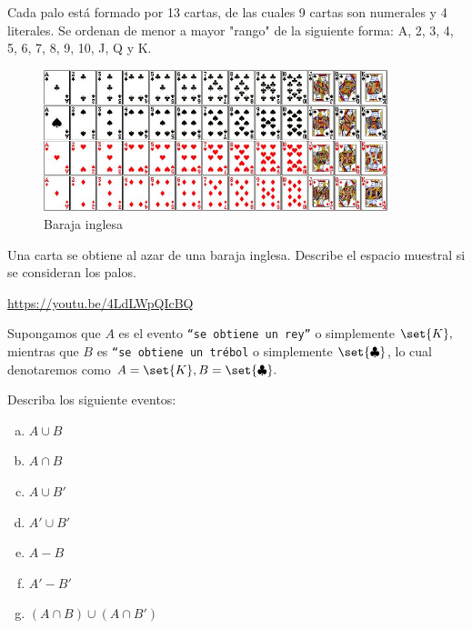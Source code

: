  Cada palo está formado por 13 cartas, de las cuales 9 cartas son numerales y 4 literales. Se ordenan de menor a mayor "rango" de la siguiente forma: A, 2, 3, 4, 5, 6, 7, 8, 9, 10, J, Q y K.
 
 \begin{figure}
  \centering
  \includegraphics[width=10cm]{./pe/deck.jpg}
  \caption{Baraja inglesa}
  \label{fig:deck}
 \end{figure}

 
 
  \begin{problema}
   \label{solved:1.1}
   Una carta se obtiene al azar de una baraja inglesa. Describe el espacio muestral si se consideran los palos.
  \end{problema}

\begin{solucion}
	\href{https://youtu.be/4LdLWpQIcBQ}{https://youtu.be/4LdLWpQIcBQ}
\end{solucion}



 

  \begin{problema}
   \label{solved:1.2}
 Supongamos que $A$ es el evento \texttt{``se obtiene un rey''} o simplemente $\set{K},$ mientras que $B$ es \texttt{``se obtiene un tr\'ebol} o simplemente $\set{\clubsuit}$, lo cual denotaremos como $A=\set{K}, B=\set{\clubsuit}.$ 
 
 Describa los siguiente eventos: 
 \begin{multicols}{2}
  \begin{enumerate}[(a)]
  \item $A\cup B$ 
  \item $A\cap B$ 
  \item $A \cup B'$ 
  \item $A' \cup B'$ 
  \item $A - B$ 
  \item $A'-B'$ 
  \item $(A\cap B) \cup (A\cap B')$
 \end{enumerate}
 \end{multicols}


  \end{problema}
 

